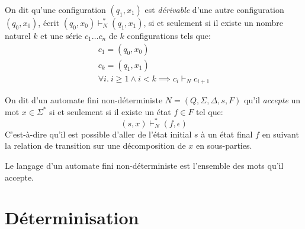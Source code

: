 On dit qu'une configuration $(q_1, x_1)$ est \og \textit{dérivable} \fg{} d'une autre configuration $(q_0, x_0)$, écrit $(q_0, x_0) \vdash_N^* (q_1, x_1)$, si et seulement si il existe un nombre naturel $k$ et une série $c_1 \dots c_n$ de $k$ configurations tels que:
\begin{gather*}
c_1 = (q_0, x_0)\\
c_k = (q_1, x_1)\\
\forall i.\ i \geq 1 \wedge i < k \implies c_i \vdash_N c_{i + 1}
\end{gather*}

On dit d'un automate fini non-déterministe $N = (Q, \Sigma, \Delta, s, F)$ qu'il \og \textit{accepte} \fg{} un mot $x \in \Sigma^*$ si et seulement si il existe un état $f \in F$ tel que:
\[
(s, x) \vdash_N^* (f, \epsilon)
\]
C'est-à-dire qu'il est possible d'aller de l'état initial $s$ à un état final $f$ en suivant la relation de transition sur une décomposition de $x$ en sous-parties.

Le langage d'un automate fini non-déterministe est l'ensemble des mots qu'il accepte.

\section{Déterminisation}

